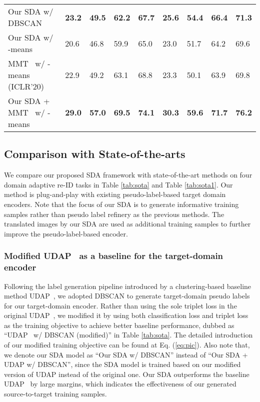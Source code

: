 \documentclass[journal]{IEEEtran}
\begin{document}
\begin{table*}[t]
\begin{center}
\begin{tabular}{P{5cm}|C{1cm}C{1cm}C{1cm}C{1cm}|C{1cm}C{1cm}C{1cm}C{1cm}}
	Our SDA w/ {DBSCAN} & \textbf{23.2} & \textbf{49.5} & \textbf{62.2} & \textbf{67.7} & \textbf{25.6} & \textbf{54.4} & \textbf{66.4} & \textbf{71.3} \\
    Our SDA w/ {-means}  &  {20.6} & {46.8} & {59.9} & {65.0} & {23.0} & {51.7} & {64.2} & {69.6} \\
	\hline
	MMT~\cite{ge2020mutual} w/ {-means} (ICLR'20) & {22.9} & {49.2} & {63.1} & {68.8} & {23.3} & {50.1} & {63.9} & {69.8} \\
	Our SDA + MMT~\cite{ge2020mutual} w/ {-means} & \textbf{29.0} & \textbf{57.0} & \textbf{69.5} & \textbf{74.1 } & \textbf{30.3} & \textbf{59.6} & \textbf{71.7} & \textbf{76.2} \\
	\hline
	\end{tabular}
	\end{center}
\end{table*}



\subsection{Comparison with State-of-the-arts}
\label{sec:sota}

We compare our proposed SDA framework with state-of-the-art methods on four domain adaptive re-ID tasks in Table \ref{tab:sota} and Table \ref{tab:sota1}.
Our method is plug-and-play with existing pseudo-label-based target domain encoders.
Note that the focus of our SDA is to generate informative training samples rather than pseudo label refinery as the previous methods. The translated images by our SDA are used as additional training samples to further improve the pseudo-label-based encoder.

\subsubsection{\textbf{ {Modified} UDAP~\cite{song2018unsupervised} as a baseline for the target-domain encoder}}
Following the label generation pipeline introduced by a clustering-based baseline method UDAP~\cite{song2018unsupervised},
we adopted DBSCAN \cite{ester1996density} to generate target-domain pseudo labels for our target-domain encoder.
{Rather than using the sole triplet loss in the original UDAP~\cite{song2018unsupervised}, we modified it by using both classification loss and triplet loss as the training objective to achieve better baseline performance, dubbed as ``UDAP~\cite{song2018unsupervised} w/ DBSCAN (modified)'' in Table \ref{tab:sota}.  The detailed introduction of our modified training objective can be found at Eq. (\ref{eq:pic}).  Also note that, we denote our SDA model as ``Our SDA w/ {DBSCAN}'' instead of ``Our SDA + UDAP w/ {DBSCAN}'', since the SDA model is trained based on our modified version of UDAP instead of the original one.}
Our SDA outperforms the baseline UDAP~\cite{song2018unsupervised} by large margins, which indicates the effectiveness of our generated source-to-target training samples.
\end{document}
